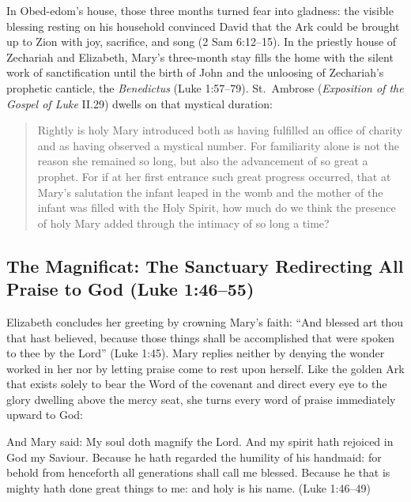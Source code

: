 In Obed-edom's house, those three months turned fear into gladness: the visible blessing resting on his household convinced David that the Ark could be brought up to Zion with joy, sacrifice, and song (2 Sam 6:12--15). In the priestly house of Zechariah and Elizabeth, Mary's three-month stay fills the home with the silent work of sanctification until the birth of John and the unloosing of Zechariah's prophetic canticle, the \textit{Benedictus} (Luke 1:57--79). St.\ Ambrose (\textit{Exposition of the Gospel of Luke} II.29) dwells on that mystical duration:

\begin{quote}\small
Rightly is holy Mary introduced both as having fulfilled an office of charity and as having observed a mystical number. For familiarity alone is not the reason she remained so long, but also the advancement of so great a prophet. For if at her first entrance such great progress occurred, that at Mary's salutation the infant leaped in the womb and the mother of the infant was filled with the Holy Spirit, how much do we think the presence of holy Mary added through the intimacy of so long a time?
\end{quote}

\subsection{The Magnificat: The Sanctuary Redirecting All Praise to God (Luke 1:46--55)}

Elizabeth concludes her greeting by crowning Mary's faith: ``And blessed art thou that hast believed, because those things shall be accomplished that were spoken to thee by the Lord'' (Luke 1:45). Mary replies neither by denying the wonder worked in her nor by letting praise come to rest upon herself. Like the golden Ark that exists solely to bear the Word of the covenant and direct every eye to the glory dwelling above the mercy seat, she turns every word of praise immediately upward to God:

\begin{scriptureblock}
And Mary said: My soul doth magnify the Lord. And my spirit hath rejoiced in God my Saviour. Because he hath regarded the humility of his handmaid: for behold from henceforth all generations shall call me blessed. Because he that is mighty hath done great things to me: and holy is his name. \textnormal{(Luke 1:46--49)}
\end{scriptureblock}


